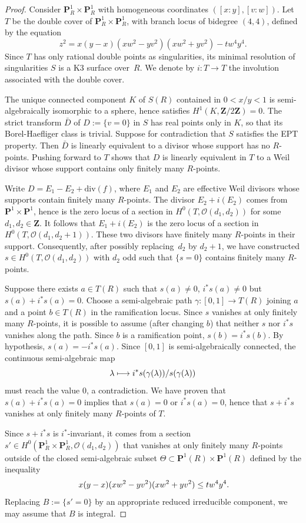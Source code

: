 \documentclass[11pt]{article}
\newcommand\mto{\mathchoice{\longmapsto}{\mapsto}{\mapsto}{\mapsto}}
\theoremstyle{plain}
\theoremstyle{definition}
\numberwithin{equation}{section}
\newcommand{\sO}{{\mathscr O}}
\renewcommand{\P}{{\mathbf P}}
\newcommand{\Z}{{\mathbf Z}}
\newcommand{\divi}{\mathrm{div}}
\begin{document}
\begin{proof}
Consider $\P^1_R\times \P^1_R$ with homogeneous coordinates $([x:y],[v:w])$.
Let $T$ be the double cover of $\P^1_R\times\P^1_R$, with branch locus of bidegree $(4,4)$, defined by the equation
\[
z^2=x(y-x)(xw^2-yv^2)(xw^2+yv^2)-tw^4y^4.
\]
Since $T$ has only rational double points as singularities, its minimal resolution of singularities $S$ is a K3 surface over~$R$. We denote by $i:T\to T$ the involution associated with the double cover.

The unique connected component $K$ of $S(R)$ contained in $0<x/y<1$ is semi-algebraically isomorphic to a sphere, hence satisfies $H^1(K,\Z/2\Z)=0$. The strict transform $\bar{D}$ of $D:=\{v=0\}$ in $S$ has real points only in $K$, so that its Borel-Haefliger class is trivial. Suppose for contradiction that $S$ satisfies the EPT property. Then $\bar{D}$ is linearly equivalent to a divisor whose support has no $R$-points. Pushing forward to $T$ shows that $D$ is linearly equivalent in $T$ to a Weil divisor whose support contains only finitely many $R$-points.

Write $D=E_1-E_2+\divi(f)$, where $E_1$ and $E_2$ are effective Weil divisors whose supports contain finitely many $R$-points. The divisor $E_2+i(E_2)$ comes from $\P^1\times \P^1$, hence is the zero locus of a section in $H^0(T,\sO(d_1,d_2))$ for some $d_1, d_2\in\Z$. It follows that $E_1+i(E_2)$ is the zero locus of a section in $H^0(T,\sO(d_1,d_2+1))$. These two divisors have finitely many $R$-points in their support. Consequently, after possibly replacing~$d_2$ by $d_2+1$, we have constructed $s\in H^0(T,\sO(d_1,d_2))$ with $d_2$ odd such that $\{s=0\}$ contains finitely many $R$-points.

Suppose there exists $a\in T(R)$ such that $s(a)\neq 0$, $i^*s(a)\neq 0$ but $s(a)+i^*s(a)=0$. Choose a semi-algebraic path $\gamma:[0,1]\to T(R)$ joining $a$ and a point $b\in T(R)$ in the ramification locus. Since $s$ vanishes at only finitely many $R$-points, it is possible to assume (after changing $b$) that neither $s$ nor $i^*s$ vanishes along the path. Since $b$ is a ramification point, $s(b)=i^*s(b)$. By hypothesis, $s(a)=-i^*s(a)$.
Since $[0,1]$ is semi-algebraically connected,
the continuous semi-algebraic map
\[
\lambda\mto i^*s(\gamma(\lambda))/s(\gamma(\lambda))
\]
must reach the value $0$, a contradiction. We have proven that $s(a)+i^*s(a)=0$ implies that $s(a)=0$ or $i^*s(a)=0$, hence that $s+i^*s$ vanishes at only finitely many $R$-points of $T$.

Since $s+i^*s$ is $i^*$-invariant, it comes from a
section $s'\in H^0(\P^1_R\times\P^1_R,\sO(d_1,d_2))$ that vanishes at only finitely many
$R$\nobreakdash-points outside of the closed semi-algebraic subset
$\Theta \subset \P^1(R)\times \P^1(R)$
defined by the inequality
\begin{equation}
\label{eq:theta inequality}
x(y-x)(xw^2-yv^2)(xw^2+yv^2)\leq tw^4y^4\rlap{.}
\end{equation}
Replacing $B:=\{s'=0\}$ by an appropriate reduced irreducible component, we
may assume that $B$ is integral.


\end{proof}
\end{document}
